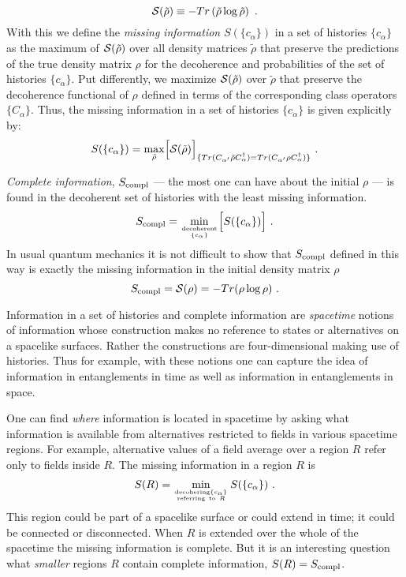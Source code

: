 \begin{equation}
{\cal S}(\tilde\rho)  \equiv -Tr\left(\tilde\rho \log \tilde\rho\right)\ .
\label{seventwo}
\end{equation}
With this we define the {\it missing} {\it information}
$S(\{c_\alpha\})$ in a set of histories $\{c_\alpha\}$ as the maximum
of ${\cal S} (\tilde\rho)$ over all density matrices $\tilde\rho$ that
preserve the predictions of the true density matrix $\rho$ for the
decoherence and probabilities of the set of histories $\{c_\alpha\}$. Put differently, we
maximize ${\cal S} (\tilde\rho)$ over $\tilde\rho$ that preserve the
decoherence functional of $\rho$ defined in terms of the corresponding
class operators $\{C_\alpha\}$. 
Thus,
the missing information in a set of histories $\{c_\alpha\}$ is given
explicitly by:
\begin{equation}
S(\{c_\alpha\}) =  \mathop{\rm max}_{\tilde\rho} \Bigl[{\cal S}
(\tilde\rho)\Bigr]_{\{Tr(C_{\alpha^\prime}\tilde\rho
C^\dagger_\alpha) = Tr(C_{\alpha^\prime}\rho
C^\dagger_\alpha)\}}\ .
\label{sevenfour}
\end{equation}

{\it Complete} {\it information}, $S_{\rm compl}$ --- the most one can
have about the initial $\rho$ --- is found in the decoherent set of
histories with the least missing information.
\begin{equation}
S_{\rm compl} = \mathop{\rm min}_{{\rm decoherent} \atop \{c_\alpha\}}
\Bigl[S(\{c_\alpha\})\Bigr]\ .
\label{sevenfive}
\end{equation}
In usual quantum mechanics it is not difficult to show that $S_{\rm
compl}$ defined in this way  is exactly the missing information in the
initial density matrix $\rho$
\begin{equation}
S_{\rm compl} = {\cal S}(\rho) = - Tr(\rho \log \rho)\ .
\label{sevensix}
\end{equation}

Information in a set of histories and complete information are {\it spacetime} notions of information whose construction makes no
reference to states or alternatives on a spacelike surfaces.  Rather the
constructions are four-dimensional
making use of histories.  Thus for
example, with these notions one can capture the idea of information in
entanglements in time as well as information in entanglements in space.

One can find {\it where} information is located in
spacetime by asking what information is available from alternatives
restricted to fields in various spacetime regions.  
For example, alternative values of a field average over a region $R$
refer only to fields inside $R$. The missing information in a
region $R$ is 
\begin{equation}
S(R) = \mathop{\rm min}_{{\rm decohering}\{c_\alpha\} 
\atop{\rm referring\ to}\ R} 
S(\{c_\alpha\})\ .
\label{sevenseven}
\end{equation}
This region could be part of a spacelike surface or could extend in
time; it could be connected or disconnected.  When $R$ is extended over
the whole of the spacetime the missing information is complete.  But it
is an
interesting question what {\it smaller} regions $R$ contain complete
information, $S(R) = S_{\rm compl}$.

